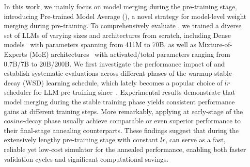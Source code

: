 In this work, we mainly focus on model merging during the pre-training stage,
introducing Pre-trained Model Average (\OURS{}),
a novel strategy for model-level weight merging during pre-training.
To comprehensively evaluate \OURS{},
we trained a diverse set of LLMs of varying sizes and architectures from scratch,
including Dense models~\cite{grattafiori2024llama} with parameters spanning from 411M to 70B, as well as
Mixture-of-Experts (MoE) architectures~\cite{shazeer2017outrageously} with activated/total parameters ranging from 0.7B/7B to 20B/200B.
We first investigate the performance impact of \OURS{} 
and establish systematic evaluations across different phases of the warmup-stable-decay (WSD) learning schedule, which lately becomes a popular choice of $lr$ scheduler for LLM pre-training since~\cite{hu2024minicpm}.
Experimental results demonstrate that model merging during the stable training phase yields consistent performance gains at different training steps.
More remarkably, applying \OURS{} at early-stage of the $cosine$-decay phase usually achieve comparable or even superior performance to their final-stage annealing counterparts.
These findings suggest that during the extensively lengthy pre-training stage with constant $lr$, \OURS{} can serve as a fast, reliable yet low-cost simulator for the annealed performance,
enabling both faster validation cycles and significant computational savings.


